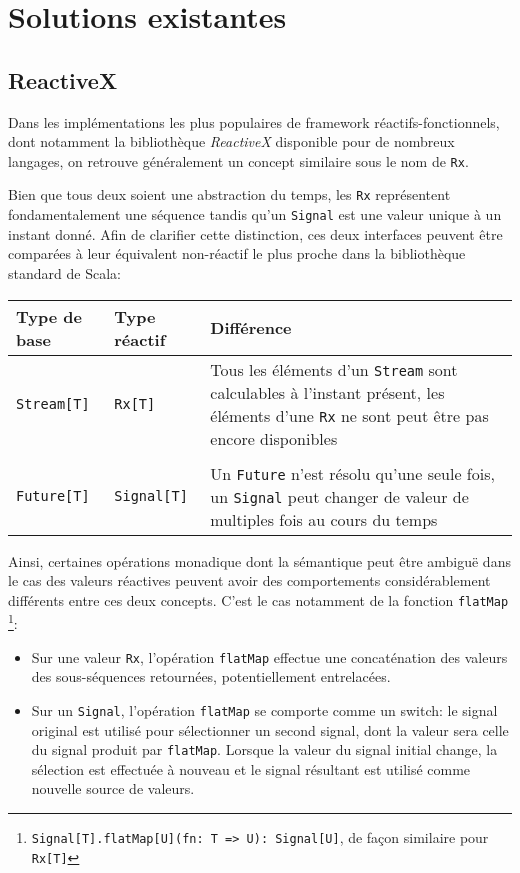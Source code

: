 \section{Solutions existantes}

\subsection{ReactiveX}
Dans les implémentations les plus populaires de framework réactifs-fonctionnels, dont notamment la bibliothèque \emph{ReactiveX} disponible pour de nombreux langages, on retrouve généralement un concept similaire sous le nom de \texttt{Rx}.

Bien que tous deux soient une abstraction du temps, les \texttt{Rx} représentent fondamentalement une séquence tandis qu'un \texttt{Signal} est une valeur unique à un instant donné. Afin de clarifier cette distinction, ces deux interfaces peuvent être comparées à leur équivalent non-réactif le plus proche dans la bibliothèque standard de Scala:

\begin{table}[H]
	\begin{tabular}{@{}p{2.5cm}p{2.5cm}p{\dimexpr\textwidth-6cm\relax}@{}}
		\toprule
		Type de base & Type réactif & Différence \\ \midrule
		\texttt{Stream[T]} & \texttt{Rx[T]} & Tous les éléments d'un \texttt{Stream} sont calculables à l'instant présent, les éléments d'une \texttt{Rx} ne sont peut être pas encore disponibles \\
		&  & \\
		\texttt{Future[T]} & \texttt{Signal[T]} & Un \texttt{Future} n'est résolu qu'une seule fois, un \texttt{Signal} peut changer de valeur de multiples fois au cours du temps \\ \bottomrule
	\end{tabular}
\end{table}

Ainsi, certaines opérations monadique dont la sémantique peut être ambiguë dans le cas des valeurs réactives peuvent avoir des comportements considérablement différents entre ces deux concepts. C'est le cas notamment de la fonction \texttt{flatMap}
\footnote{\texttt{Signal[T].flatMap[U](fn: T => U): Signal[U]}, de façon similaire pour \texttt{Rx[T]}}:

\begin{itemize}
	\item Sur une valeur \texttt{Rx}, l'opération \texttt{flatMap} effectue une concaténation des valeurs des sous-séquences retournées, potentiellement entrelacées.
	\item Sur un \texttt{Signal}, l'opération \texttt{flatMap} se comporte comme un switch: le signal original est utilisé pour sélectionner un second signal, dont la valeur sera celle du signal produit par \texttt{flatMap}. Lorsque la valeur du signal initial change, la sélection est effectuée à nouveau et le signal résultant est utilisé comme nouvelle source de valeurs.
\end{itemize}

